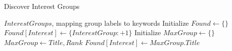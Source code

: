 \documentclass{article}
\begin{document}
\clearpage

\begin{algorithm}
	\caption{Discover Interest Groups}\label{interests}
	\begin{algorithmic}[1]
		\Require $InterestGroups$, mapping group labels to keywords
		\State Initialize $Found \gets \{\}$
		\State $Found[Interest] \gets \{InterestGroup: +1\}$
		\EndIf{}
		\EndFor
		\EndFor
		\EndProcedure
		\State Initialize $MaxGroup \gets \{\}$
		\State $MaxGroup \gets {Title, Rank}$
		\EndIf
		\EndFor
		\State $Found[Interest] \gets MaxGroup.Title$
		\EndFor
		\EndProcedure
	\end{algorithmic}
\end{algorithm}
\end{document}
